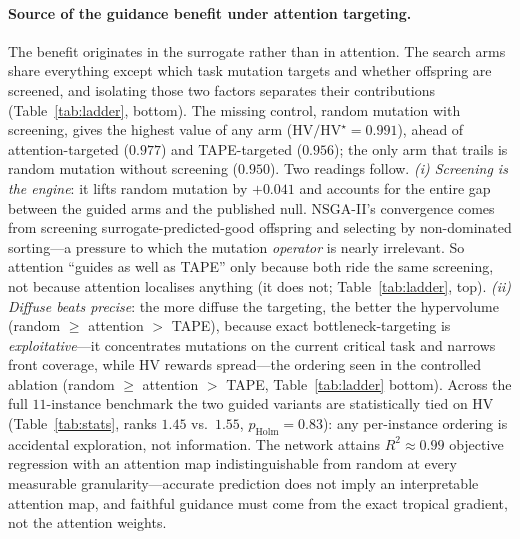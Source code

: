 \documentclass[11pt]{article}
\begin{document}
\paragraph{Source of the guidance benefit under attention targeting.}
The benefit originates in the surrogate rather than in attention. The search arms share
everything except which task mutation targets and whether offspring are screened, and
isolating those two factors separates their contributions (Table~\ref{tab:ladder},
bottom). The missing control, random mutation with screening, gives the highest value of
any arm ($\mathrm{HV}/\mathrm{HV}^\star=0.991$), ahead of attention-targeted ($0.977$) and
TAPE-targeted ($0.956$); the only arm that trails is random mutation without screening
($0.950$). Two readings follow. \emph{(i) Screening is the engine}: it lifts random mutation
by $+0.041$ and accounts for the entire gap between the guided arms and the published null.
NSGA-II's convergence comes from screening surrogate-predicted-good offspring and selecting by
non-dominated sorting---a pressure to which the mutation \emph{operator} is nearly irrelevant.
So attention ``guides as well as TAPE'' only because both ride the same screening, not because
attention localises anything (it does not; Table~\ref{tab:ladder}, top). \emph{(ii) Diffuse
beats precise}: the more diffuse the targeting, the better the hypervolume
(random $\ge$ attention $>$ TAPE), because exact bottleneck-targeting is
\emph{exploitative}---it concentrates mutations on the current critical task and narrows front
coverage, while HV rewards spread---the ordering seen in the controlled ablation
(random $\ge$ attention $>$ TAPE, Table~\ref{tab:ladder} bottom). Across the full
$11$-instance benchmark the two guided variants are statistically tied on HV
(Table~\ref{tab:stats}, ranks $1.45$ vs.\ $1.55$, $p_{\text{Holm}}=0.83$): any per-instance
ordering is accidental exploration, not information. The network attains
$R^2\!\approx\!0.99$ objective regression with an attention map indistinguishable from random
at every measurable granularity---accurate prediction does not imply an interpretable
attention map, and faithful guidance must come from the exact tropical gradient, not the
attention weights.
\end{document}
